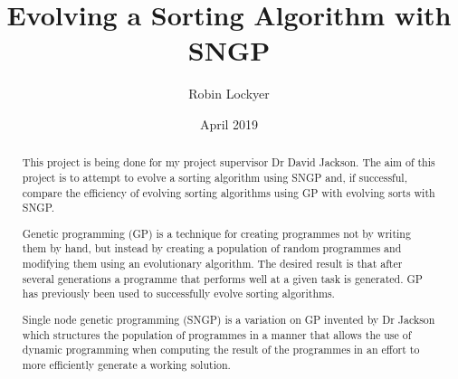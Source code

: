 \documentclass{report}
\title{Evolving a Sorting Algorithm with SNGP}
\author{Robin Lockyer}
\date{April 2019}
\affil{University of Liverpool}
\begin{document}
	
	\maketitle	
	
	\begin{abstract}
		This project is being done for my project supervisor Dr David Jackson. The aim of this project is to attempt to evolve a sorting algorithm using SNGP and, if successful, compare the efficiency of evolving sorting algorithms using GP with evolving sorts with SNGP.
		
		Genetic programming (GP) is a technique for creating programmes not by writing them by hand, but instead by creating a population of random programmes and modifying them using an evolutionary algorithm. The desired result is that after several generations a programme that performs well at a given task is generated. GP has previously been used to successfully evolve sorting algorithms.
		
		Single node genetic programming (SNGP) is a variation on GP invented by Dr Jackson which structures the population of programmes in a manner that allows the use of dynamic programming when computing the result of the programmes in an effort to more efficiently generate a working solution.
	\end{abstract}
	
\end{document}
